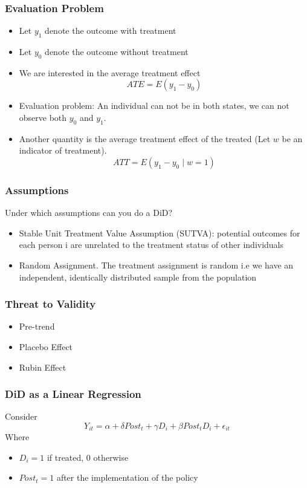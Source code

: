\documentclass{beamer}
\newcommand{\1}{\mathbb{1}}
\begin{document}
\begin{frame}\frametitle{Evaluation Problem}
\begin{itemize}
\item Let $y_1$ denote the outcome with treatment 
 \item Let $y_0$ denote the outcome without treatment
 \item We are interested in the average treatment effect 
\begin{equation}
 ATE = E(y_1 - y_0)
\end{equation}
 \item Evaluation problem: An individual can not be in both states, we can not observe both $y_0$ and $y_1$.
 \item Another quantity is the average treatment effect of the treated (Let $w$ be an indicator of treatment).
 \begin{equation}
  ATT = E(y_1 - y_0 \mid w=1)
 \end{equation}
\end{itemize}
\end{frame}

\begin{frame}\frametitle{Assumptions}
Under which assumptions can you do a DiD?
\begin{itemize}
 \item Stable Unit Treatment Value
Assumption (SUTVA):  potential outcomes for each person i
 are unrelated to the treatment status of other individuals
\item  Random Assignment.
 The treatment assignment is random i.e we have an independent, identically distributed
sample from the population
\end{itemize}
\end{frame}

\begin{frame}\frametitle{Threat to Validity}
\begin{itemize}
 \item Pre-trend
 \item Placebo Effect
 \item Rubin Effect
\end{itemize}
\end{frame}

\begin{frame}\frametitle{DiD as a Linear Regression}
Consider 
\begin{equation}
 Y_{it} = \alpha + \delta Post_t + \gamma D_i + \beta Post_t D_i + \epsilon_{it}
\end{equation}
Where
\begin{itemize}
 \item $D_i=1$ if treated, 0 otherwise
 \item $Post_t=1$ after the implementation of the policy 
\end{itemize}
\end{frame}
\end{document}
